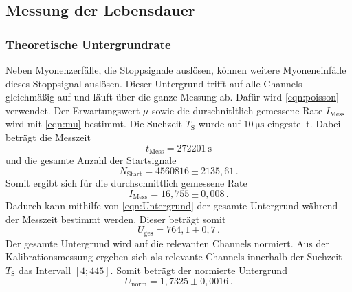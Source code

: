 \subsection{Messung der Lebensdauer}
  \subsubsection{Theoretische Untergrundrate}
    Neben Myonenzerfälle, die Stoppsignale auslösen, können weitere Myoneneinfälle dieses Stoppsignal auslösen.
    Dieser Untergrund trifft auf alle Channels gleichmäßig auf und läuft über die ganze Messung ab.
    Dafür wird \eqref{eqn:poisson} verwendet.
    Der Erwartungswert $\mu$ sowie die durschnitltlich gemessene Rate $I_\text{Mess}$ wird mit \eqref{eqn:mu} bestimmt.
    Die Suchzeit $T_\text{S}$ wurde auf $\SI{10}{\micro\second}$ eingestellt.
    Dabei beträgt die Messzeit
    \begin{equation*}
      t_\text{Mess} = \SI{272201}{\second}
    \end{equation*}
    und die gesamte Anzahl der Startsignale
    \begin{equation*}
      N_\text{Start} = 4560816 \pm 2135,61 \, .
    \end{equation*}
    Somit ergibt sich für die durchschnittlich gemessene Rate
    \begin{equation*}
      I_\text{Mess} = 16,755 \pm 0,008 \, .
    \end{equation*}
    Dadurch kann mithilfe von \eqref{eqn:Untergrund} der gesamte Untergrund während der Messzeit bestimmt werden.
    Dieser beträgt somit
    \begin{equation*}
      U_\text{ges} = 764,1 \pm 0,7 \,.
    \end{equation*}
    Der gesamte Untergrund wird auf die relevanten Channels normiert.
    Aus der Kalibrationsmessung ergeben sich als relevante Channels innerhalb der Suchzeit $T_\text{S}$ das Intervall $[4;445]$.
    Somit beträgt der normierte Untergrund
    \begin{equation*}
      U_\text{norm} = 1,7325 \pm 0,0016 \, .
    \end{equation*}
  

